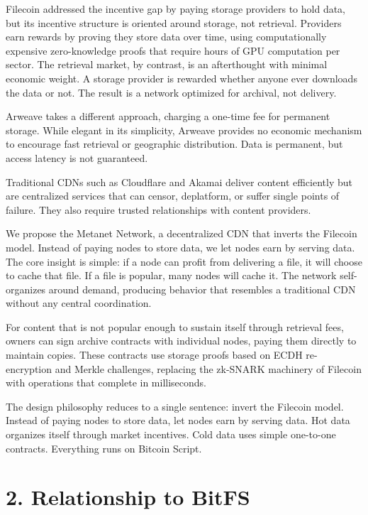 \documentclass[11pt,a4paper]{article}
\begin{document}
Filecoin addressed the incentive gap by paying storage providers to hold data, but its incentive structure is oriented around storage, not retrieval. Providers earn rewards by proving they store data over time, using computationally expensive zero-knowledge proofs that require hours of GPU computation per sector. The retrieval market, by contrast, is an afterthought with minimal economic weight. A storage provider is rewarded whether anyone ever downloads the data or not. The result is a network optimized for archival, not delivery.

Arweave takes a different approach, charging a one-time fee for permanent storage. While elegant in its simplicity, Arweave provides no economic mechanism to encourage fast retrieval or geographic distribution. Data is permanent, but access latency is not guaranteed.

Traditional CDNs such as Cloudflare and Akamai deliver content efficiently but are centralized services that can censor, deplatform, or suffer single points of failure. They also require trusted relationships with content providers.

We propose the Metanet Network, a decentralized CDN that inverts the Filecoin model. Instead of paying nodes to store data, we let nodes earn by serving data. The core insight is simple: if a node can profit from delivering a file, it will choose to cache that file. If a file is popular, many nodes will cache it. The network self-organizes around demand, producing behavior that resembles a traditional CDN without any central coordination.

For content that is not popular enough to sustain itself through retrieval fees, owners can sign archive contracts with individual nodes, paying them directly to maintain copies. These contracts use storage proofs based on ECDH re-encryption and Merkle challenges, replacing the zk-SNARK machinery of Filecoin with operations that complete in milliseconds.

The design philosophy reduces to a single sentence: invert the Filecoin model. Instead of paying nodes to store data, let nodes earn by serving data. Hot data organizes itself through market incentives. Cold data uses simple one-to-one contracts. Everything runs on Bitcoin Script.

\section{2. Relationship to BitFS}
\end{document}
